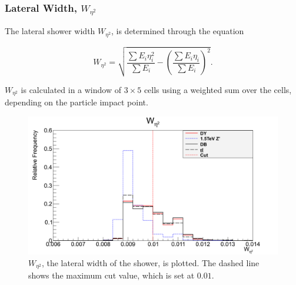 \documentclass{article}
\begin{document}
\subsubsection{Lateral Width, $W_{\eta^2}$}

The lateral shower width $W_{\eta^2}$, is determined through the equation 

\begin{equation}
W_{\eta^2} = \sqrt{\frac{\sum E_i \eta_{i}^{2}}{\sum E_i} - \left( \frac{\sum E_i \eta_i}{\sum E_i} \right)^2 }.
\end{equation}

$W_{\eta^2}$ is calculated in a window of $3\times5$ cells using a weighted sum over the cells, depending on the particle impact point.

\begin{figure}[h]
    \centering
    \includegraphics[scale=0.25]{images/variables/wEta.png}
    \caption{$W_{\eta^2}$, the lateral width of the shower, is plotted. The dashed line shows the maximum cut value, which is set at $0.01$\label{fig:wEta}. }
\end{figure}

\end{document}
